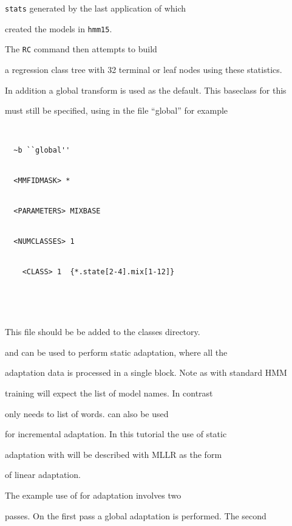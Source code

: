 \texttt{stats} generated by the last application of  which 


created the models in \texttt{hmm15}. 


The \texttt{RC} command then attempts to build 


a regression class tree with 32 terminal or leaf nodes using these statistics.


In addition a global transform is used as the default. This baseclass for this


must still be specified, using in the file ``global'' for example





\begin{verbatim}


  ~b ``global''


  <MMFIDMASK> *


  <PARAMETERS> MIXBASE


  <NUMCLASSES> 1


    <CLASS> 1  {*.state[2-4].mix[1-12]}      





\end{verbatim}


This file should be be added to the classes directory.


 


 and  can be used to perform static adaptation, where all the


adaptation data is processed in a single block. Note as with standard HMM


training  will expect the list of model names. In contrast 


 only needs to list of words.  can also be used


for incremental adaptation. In this tutorial the use of static 


adaptation with  will be described with MLLR as the form


of linear adaptation.





The example use of  for adaptation involves two


passes. On the first pass a global adaptation is performed. The second


